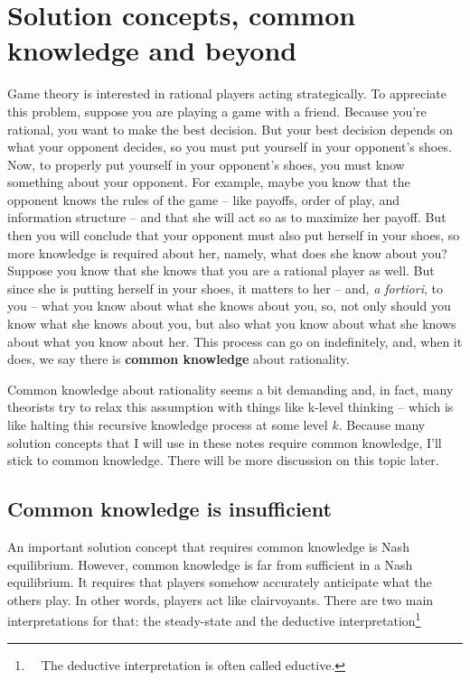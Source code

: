 \documentclass[../../main.tex]{subfiles}
\begin{document}
    \section{Solution concepts, common knowledge and beyond}
    Game theory is interested in rational players acting strategically. To appreciate this problem, suppose you are playing a game with a friend. Because you're rational, you want to make the best decision. But your best decision depends on what your opponent decides, so you must put yourself in your opponent's shoes. Now, to properly put yourself in your opponent's shoes, you must know something about your opponent. For example, maybe you know that the opponent knows the rules of the game -- like payoffs, order of play, and information structure -- and that she will act so as to maximize her payoff. But then you will conclude that your opponent must also put herself in your shoes, so more knowledge is required about her, namely, what does she know about you? Suppose you know that she knows that you are a rational player as well. But since she is putting herself in your shoes, it matters to her -- and, \textit{a fortiori}, to you -- what you know about what she knows about you, so, not only should you know what she knows about you, but also what you know about what she knows about what you know about her. This process can go on indefinitely, and, when it does, we say there is \textbf{common knowledge} about rationality.

    Common knowledge about rationality seems a bit demanding and, in fact, many theorists try to relax this assumption with things like k-level thinking -- which is like halting this recursive knowledge process at some level $k$. Because many solution concepts that I will use in these notes require common knowledge, I'll stick to common knowledge. There will be more discussion on this topic later. 

    \subsection{Common knowledge is insufficient}
    An important solution concept that requires common knowledge is Nash equilibrium. However, common knowledge is far from sufficient in a Nash equilibrium. It requires that players somehow accurately anticipate what the others play. In other words, players act like clairvoyants. There are two main interpretations for that: the steady-state and the deductive interpretation\footnote{~~The deductive interpretation is often called eductive.}
\end{document}
